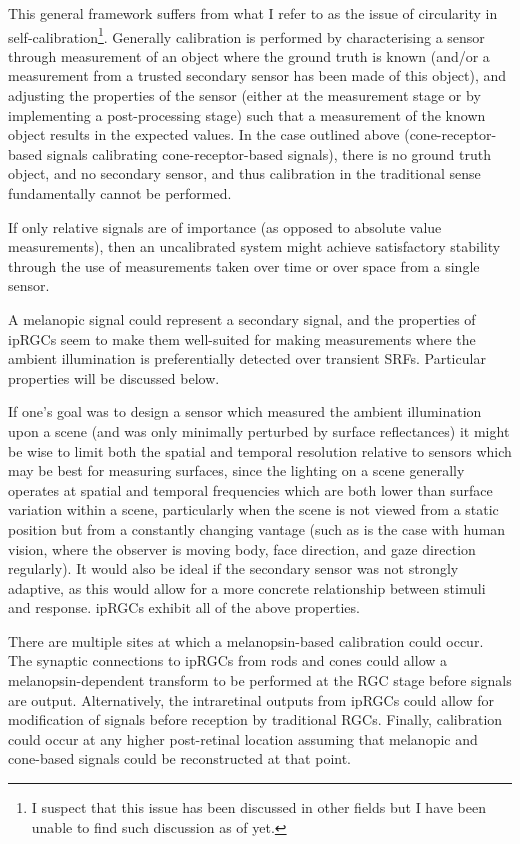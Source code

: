 This general framework suffers from what I refer to as the issue of circularity in self-calibration\footnote{I suspect that this issue has been discussed in other fields but I have been unable to find such discussion as of yet.}. Generally calibration is performed by characterising a sensor through measurement of an object where the ground truth is known (and/or a measurement from a trusted secondary sensor has been made of this object), and adjusting the properties of the sensor (either at the measurement stage or by implementing a post-processing stage) such that a measurement of the known object results in the expected values. In the case outlined above (cone-receptor-based signals calibrating cone-receptor-based signals), there is no ground truth object, and no secondary sensor, and thus calibration in the traditional sense fundamentally cannot be performed.

If only relative signals are of importance (as opposed to absolute value measurements), then an uncalibrated system might achieve satisfactory stability through the use of measurements taken over time or over space from a single sensor.

A melanopic signal could represent a secondary signal, and the properties of \glspl{ipRGC} seem to make them well-suited for making measurements where the ambient illumination is preferentially detected over transient \glspl{SRF}. Particular properties will be discussed below.

If one's goal was to design a sensor which measured the ambient illumination upon a scene (and was only minimally perturbed by surface reflectances) it might be wise to limit both the spatial and temporal resolution relative to sensors which may be best for measuring surfaces, since the lighting on a scene generally operates at spatial and temporal frequencies which are both lower than surface variation within a scene, particularly when the scene is not viewed from a static position but from a constantly changing vantage (such as is the case with human vision, where the observer is moving body, face direction, and gaze direction regularly). It would also be ideal if the secondary sensor was not strongly adaptive, as this would allow for a more concrete relationship between stimuli and response. \Glspl{ipRGC} exhibit all of the above properties.

There are multiple sites at which a melanopsin-based calibration could occur. The synaptic connections to \glspl{ipRGC} from rods and cones could allow a melanopsin-dependent transform to be performed at the \gls{RGC} stage before signals are output. Alternatively, the intraretinal outputs from \glspl{ipRGC} could allow for modification of signals before reception by traditional \glspl{RGC}. Finally, calibration could occur at any higher post-retinal location assuming that melanopic and cone-based signals could be reconstructed at that point.





\clearpage


